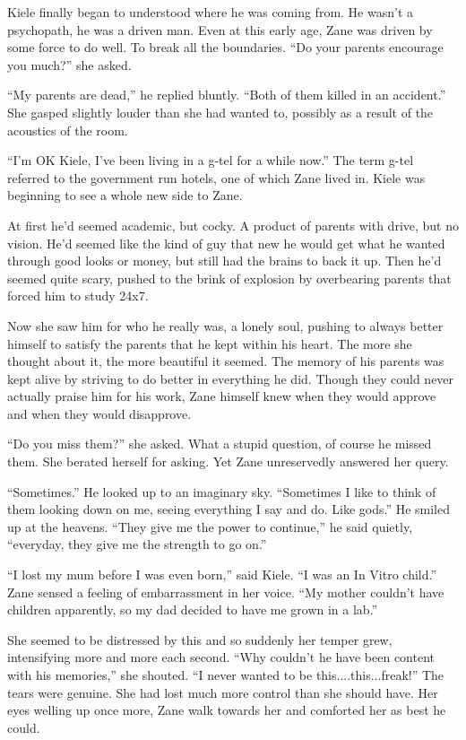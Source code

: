 Kiele finally began to understood where he was coming from.  He wasn't a psychopath, he was a driven man.  Even at this early age, Zane was driven by some force to do well.  To break all the boundaries.  ``Do your parents encourage you much?'' she asked.  

``My parents are dead,'' he replied bluntly.  ``Both of them killed in an accident.''  She gasped slightly louder than she had wanted to, possibly as a result of the acoustics of the room.  

``I'm OK Kiele, I've been living in a g-tel for a while now.''  The term g-tel referred to the government run hotels, one of which Zane lived in.  Kiele was beginning to see a whole new side to Zane.  

At first he'd seemed academic, but cocky.  A product of parents with drive, but no vision.  He'd seemed like the kind of guy that new he would get what he wanted through good looks or money, but still had the brains to back it up.  Then he'd seemed quite scary, pushed to the brink of explosion by overbearing parents that forced him to study 24x7.  

Now she saw him for who he really was, a lonely soul, pushing to always better himself to satisfy the parents that he kept within his heart.  The more she thought about it, the more beautiful it seemed.  The memory of his parents was kept alive by striving to do better in everything he did.  Though they could never actually praise him for his work, Zane himself knew when they would approve and when they would disapprove.  

 ``Do you miss them?'' she asked.  What a stupid question, of course he missed them.  She berated herself for asking.  Yet Zane unreservedly answered her query.

``Sometimes.''  He looked up to an imaginary sky.  ``Sometimes I like to think of them looking down on me, seeing everything I say and do.  Like gods.''  He smiled up at the heavens.  ``They give me the power to continue,'' he said quietly, ``everyday, they give me the strength to go on.''

``I lost my mum before I was even born,'' said Kiele.  ``I was an In Vitro child.''  Zane sensed a feeling of embarrassment in her voice.  ``My mother couldn't have children apparently, so my dad decided to have me grown in a lab.''  

She seemed to be distressed by this and so suddenly her temper grew, intensifying more and more each second.  ``Why couldn't he have been content with his memories,'' she shouted.  ``I never wanted to be this....this...freak!''  The tears were genuine.  She had lost much more control than she should have.  Her eyes welling up once more, Zane walk towards her and comforted her as best he could.  

